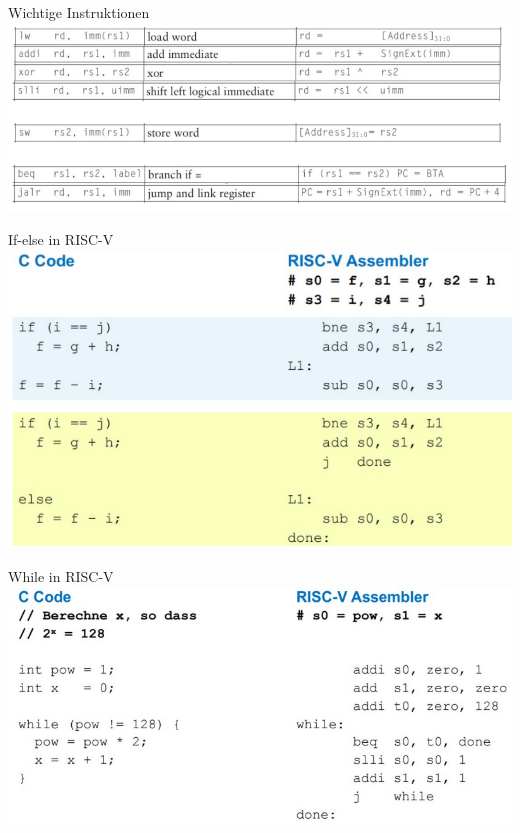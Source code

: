 \documentclass[
  german,            %
  aspectratio=169,    %
]{tumbeamer}
\begin{document}
\begin{frame}[c]{Wichtige Instruktionen}{}
  \centering
  \includegraphics[width=\linewidth]{w03_integerinstructions.png}
\end{frame}

\begin{frame}[c]{If-else in RISC-V}{}
  \centering
  \includegraphics[width=0.75\linewidth]{w03_ifelseassembly.png}
\end{frame}

\begin{frame}[c]{While in RISC-V}{}
  \centering
  \includegraphics[width=0.8\linewidth]{w03_whileassembly.png}
\end{frame}
\end{document}
